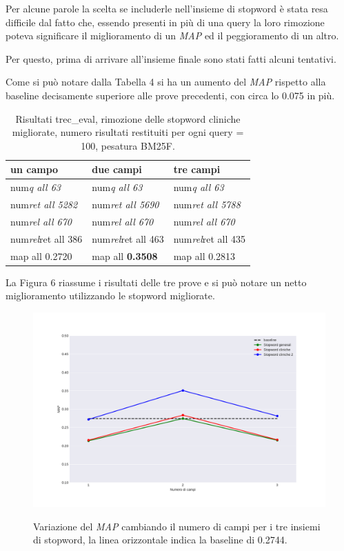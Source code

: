 \documentclass[runningheads]{llncs}
\begin{document}
Per alcune parole la scelta se includerle nell'insieme di stopword \`e stata resa difficile dal fatto che, essendo presenti in pi\`u di una query la loro rimozione poteva significare il miglioramento di un \textit{MAP} ed il peggioramento di un altro.

Per questo, prima di arrivare all'insieme finale sono stati fatti alcuni tentativi.

Come si pu\`o notare dalla Tabella 4 si ha un aumento del \textit{MAP} rispetto alla baseline decisamente superiore alle prove precedenti, con circa lo 0.075 in pi\`u.
\begin{table}
\vspace{-3mm}
\centering
\begin{tabular}{lll}
\hline
\textbf{ un campo }           & \textbf{ due campi }           & \textbf{ tre campi }            \\ \hline
 num\textit{q all 63 }       &  num\textit{q all 63 }       &  num\textit{q all 63 }        \\
 num\textit{ret all 5282 }  &  num\textit{ret all 5690 }  &  num\textit{ret all 5788 }   \\
 num\textit{rel all 670 }    &  num\textit{rel all 670 }    &  num\textit{rel all 670 }     \\
 num\textit{rel}ret all 386  &  num\textit{rel}ret all 463  &  num\textit{rel}ret all 435   \\
map all 0.2720               & map all \bf 0.3508               & map all 0.2813          \\ \hline
\end{tabular}

\caption{ Risultati trec\_eval, rimozione delle stopword cliniche migliorate, numero risultati restituiti per ogni query = 100, pesatura BM25F.}
\vspace{-7mm}
\end{table}

La Figura 6 riassume i risultati delle tre prove e si pu\`o notare un netto miglioramento utilizzando le stopword migliorate.


\begin{figure}%
    \centering
    {{\includegraphics[width=0.8\linewidth]{maps} }}%
    \caption{Variazione del \textit{MAP} cambiando il numero di campi per i tre insiemi di stopword, la linea orizzontale indica la baseline di 0.2744.}%
    \vspace{-10mm}
\end{figure}
\end{document}
